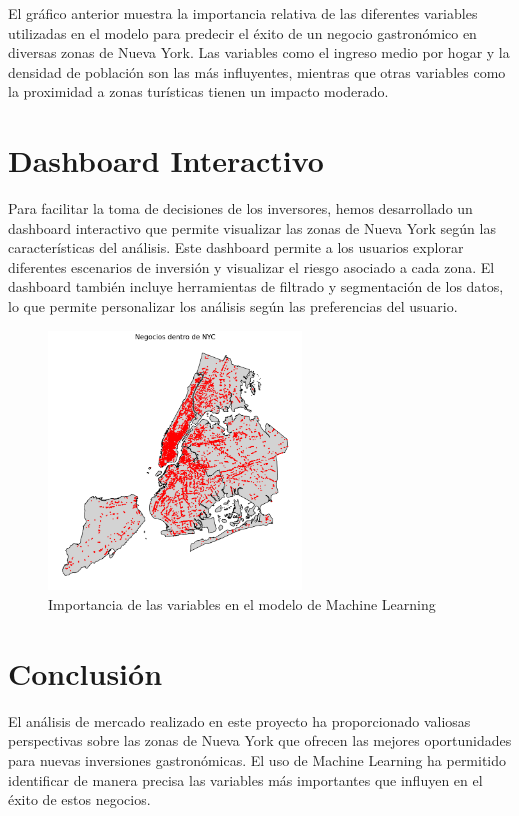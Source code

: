 \documentclass[twoside,11pt]{article}
\begin{document}
El gráfico anterior muestra la importancia relativa de las diferentes variables utilizadas en el modelo para predecir el éxito de un negocio gastronómico en diversas zonas de Nueva York. Las variables como el ingreso medio por hogar y la densidad de población son las más influyentes, mientras que otras variables como la proximidad a zonas turísticas tienen un impacto moderado.

\section{Dashboard Interactivo}

Para facilitar la toma de decisiones de los inversores, hemos desarrollado un dashboard interactivo que permite visualizar las zonas de Nueva York según las características del análisis. Este dashboard permite a los usuarios explorar diferentes escenarios de inversión y visualizar el riesgo asociado a cada zona. El dashboard también incluye herramientas de filtrado y segmentación de los datos, lo que permite personalizar los análisis según las preferencias del usuario.

\begin{figure}[h] 
  \centering
  \includegraphics[width=0.6\textwidth]{restaurantes_nyc.png} 
  \caption{Importancia de las variables en el modelo de Machine Learning}
  \label{fig:reataurantes_nyc} 
\end{figure}

\section{Conclusión}

El análisis de mercado realizado en este proyecto ha proporcionado valiosas perspectivas sobre las zonas de Nueva York que ofrecen las mejores oportunidades para nuevas inversiones gastronómicas. El uso de Machine Learning ha permitido identificar de manera precisa las variables más importantes que influyen en el éxito de estos negocios.
\end{document}
